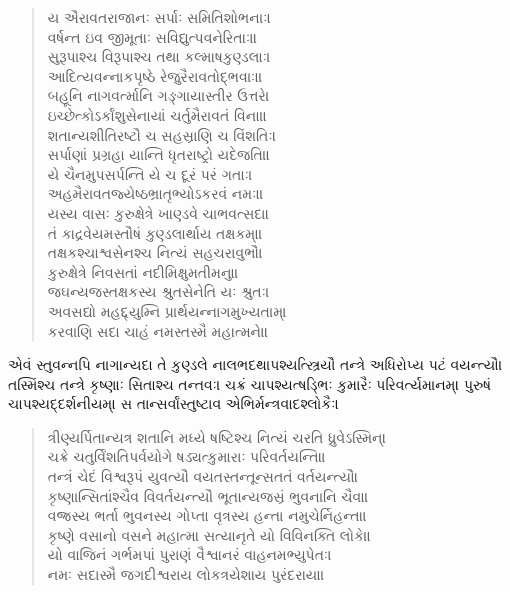 \documentclass[a4paper,12pt]{article}
\begin{document}
\begin{verse}
ય ઐરાવતરાજાનઃ સર્પાઃ સમિતિશોભનાઃ। \\
વર્ષન્ત ઇવ જીમૂતાઃ સવિદ્યુત્પવનેરિતાઃ॥ \\
સુરૂપાશ્ચ વિરૂપાશ્ચ તથા કલ્માષકુણ્ડલાઃ। \\
આદિત્યવન્નાકપૃષ્ઠે રેજુરૈરાવતોદ્ભવાઃ॥ \\
બહૂનિ નાગવર્ત્માનિ ગઙ્ગાયાસ્તીર ઉત્તરે। \\
ઇચ્છેત્કોઽર્કાંશુસેનાયાં ચર્તુમૈરાવતં વિના॥ \\
શતાન્યશીતિરષ્ટૌ ચ સહસ્રાણિ ચ વિંશતિઃ। \\
સર્પાણાં પ્રગ્રહા યાન્તિ ધૃતરાષ્ટ્રો યદેજતિ॥ \\
યે ચૈનમુપસર્પન્તિ યે ચ દૂરં પરં ગતાઃ। \\
અહમૈરાવતજ્યેષ્ઠભ્રાતૃભ્યોઽકરવં નમઃ॥ \\
યસ્ય વાસઃ કુરુક્ષેત્રે ખાણ્ડવે ચાભવત્સદા। \\
તં કાદ્રવેયમસ્તૌષં કુણ્ડલાર્થાય તક્ષકમ્॥ \\
તક્ષકશ્ચાશ્વસેનશ્ચ નિત્યં સહચરાવુભૌ। \\
કુરુક્ષેત્રે નિવસતાં નદીમિક્ષુમતીમનુ॥ \\
જઘન્યજસ્તક્ષકસ્ય શ્રુતસેનેતિ યઃ શ્રુતઃ। \\
અવસદ્યો મહદ્દ્યુમ્નિ પ્રાર્થયન્નાગમુખ્યતામ્। \\
કરવાણિ સદા ચાહં નમસ્તસ્મૈ મહાત્મને॥ \\
\end{verse}
એવં સ્તુવન્નપિ નાગાન્યદા તે કુણ્ડલે નાલભદથાપશ્યત્સ્ત્રિયૌ તન્ત્રે અધિરોપ્ય પટં વયન્ત્યૌ।
તસ્મિંશ્ચ તન્ત્રે કૃષ્ણાઃ સિતાશ્ચ તન્તવઃ। ચક્રં ચાપશ્યત્ષડ્ભિઃ કુમારૈઃ પરિવર્ત્યમાનમ્। પુરુષં ચાપશ્યદ્દર્શનીયમ્।
સ તાન્સર્વાંસ્તુષ્ટાવ એભિર્મન્ત્રવાદશ્લોકૈઃ।
\begin{verse}
ત્રીણ્યર્પિતાન્યત્ર શતાનિ મધ્યે ષષ્ટિશ્ચ નિત્યં ચરતિ ધ્રુવેઽસ્મિન્। \\
ચક્રે ચતુર્વિંશતિપર્વયોગે ષડ્યત્કુમારાઃ પરિવર્તયન્તિ॥ \\
તન્ત્રં ચેદં વિશ્વરૂપં યુવત્યૌ વયતસ્તન્તૂન્સતતં વર્તયન્ત્યૌ। \\
કૃષ્ણાન્સિતાંશ્ચૈવ વિવર્તયન્ત્યૌ ભૂતાન્યજસ્રં ભુવનાનિ ચૈવ॥ \\
વજ્રસ્ય ભર્તા ભુવનસ્ય ગોપ્તા વૃત્રસ્ય હન્તા નમુચેર્નિહન્તા। \\
કૃષ્ણે વસાનો વસને મહાત્મા સત્યાનૃતે યો વિવિનક્તિ લોકે॥ \\
યો વાજિનં ગર્ભમપાં પુરાણં વૈશ્વાનરં વાહનમભ્યુપેતઃ। \\
નમઃ સદાસ્મૈ જગદીશ્વરાય લોકત્રયેશાય પુરંદરાય॥ \\
\end{verse}
\end{document}
